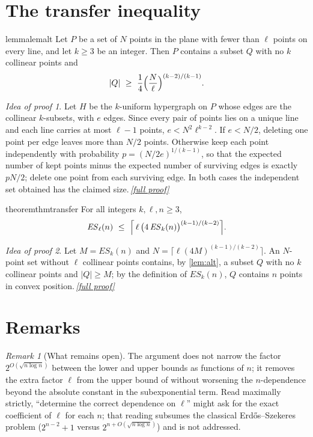 \documentclass[11pt,a4paper]{article}
\theoremstyle{plain}
\theoremstyle{definition}
\theoremstyle{remark}
\newtheorem{remark}[theorem]{Remark}
\newtheorem*{proofidea}{Idea of proof}
\newcommand{\fullproofref}[1]{\,\hyperref[#1]{\textit{[full proof]}}}
\newcommand{\ES}{\mathit{ES}}
\begin{document}
\section{The transfer inequality}

\begin{restatable}{lemma}{lemalt}\label{lem:alt}
Let $P$ be a set of $N$ points in the plane with fewer than $\ell$ points on every line, and let $k\ge3$ be an integer. Then $P$ contains a subset $Q$ with no $k$ collinear points and
\[
 |Q|\ \ge\ \frac14\Bigl(\frac N\ell\Bigr)^{(k-2)/(k-1)}.
\]
\end{restatable}
\begin{proofidea}
Let $H$ be the $k$-uniform hypergraph on $P$ whose edges are the collinear $k$-subsets, with $e$ edges. Since every pair of points lies on a unique line and each line carries at most $\ell-1$ points, $e<N^2\ell^{k-2}$. If $e<N/2$, deleting one point per edge leaves more than $N/2$ points. Otherwise keep each point independently with probability $p=(N/2e)^{1/(k-1)}$, so that the expected number of kept points minus the expected number of surviving edges is exactly $pN/2$; delete one point from each surviving edge. In both cases the independent set obtained has the claimed size.\fullproofref{pf:alt}
\end{proofidea}

\begin{restatable}{theorem}{thmtransfer}\label{thm:transfer}
For all integers $k,\ell,n\ge3$,
\[
 \ES_\ell(n)\ \le\ \Bigl\lceil\,\ell\,\bigl(4\,\ES_k(n)\bigr)^{(k-1)/(k-2)}\Bigr\rceil .
\]
\end{restatable}
\begin{proofidea}
Let $M=\ES_k(n)$ and $N=\lceil\ell(4M)^{(k-1)/(k-2)}\rceil$. An $N$-point set without $\ell$ collinear points contains, by \cref{lem:alt}, a subset $Q$ with no $k$ collinear points and $|Q|\ge M$; by the definition of $\ES_k(n)$, $Q$ contains $n$ points in convex position.\fullproofref{pf:transfer}
\end{proofidea}

\section{Remarks}

\begin{remark}[What remains open]\label{rem:open}
The argument does not narrow the factor $2^{O(\sqrt{n\log n})}$ between the lower and upper bounds as functions of $n$; it removes the extra factor $\ell$ from the upper bound of \cite{CFHMSV} without worsening the $n$-dependence beyond the absolute constant in the subexponential term. Read maximally strictly, ``determine the correct dependence on $\ell$'' might ask for the exact coefficient of $\ell$ for each $n$; that reading subsumes the classical Erdős--Szekeres problem ($2^{n-2}+1$ versus $2^{n+O(\sqrt{n\log n})}$) and is not addressed.
\end{remark}
\end{document}
